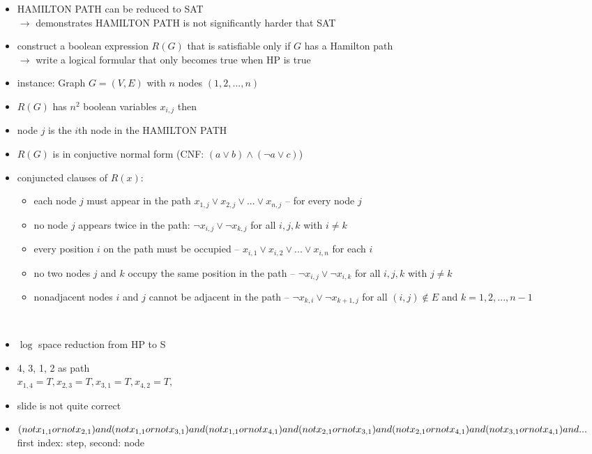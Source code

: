 \documentclass[a4]{scrartcl}
\begin{document}
\begin{itemize}
\item HAMILTON PATH can be reduced to SAT \\
$\rightarrow$ demonstrates HAMILTON PATH is not significantly harder that SAT
\item construct a boolean expression $R(G)$ that is satisfiable only if $G$ has a Hamilton path \\
$\rightarrow$ write a logical formular that only becomes true when HP is true 

\item instance: Graph $G = (V,E)$ with $n$ nodes $(1, 2, ..., n)$ 
\item $R(G)$ has $n^2$ boolean variables $x_{i,j}$ then
\item node $j$ is the $i$th node in the HAMILTON PATH
\item $R(G)$ is in conjuctive normal form (CNF: $(a \vee b) \wedge (\lnot a \vee c)$)
\item conjuncted clauses of $R(x)$:
\begin{itemize}
\item each node $j$ must appear in the path $x_{1,j} \vee x_{2,j} \vee ... \vee x_{n,j}$ -- for every node $j$
\item no node $j$ appears twice in the path: $\lnot x_{i,j} \vee \lnot x_{k,j}$ for all $i, j, k$ with $i \neq k$
\item every position $i$ on the path must be occupied -- $x_{i,1} \vee x_{i,2} \vee ... \vee x_{i,n}$ for each $i$
\item no two nodes $j$ and $k$ occupy the same position in the path -- $\lnot x_{i,j} \vee \lnot x_{i,k}$ for all $i, j, k$ with $j \neq k$
\item nonadjacent nodes $i$ and $j$ cannot be adjacent in the path -- $\lnot x_{k,i} \vee \lnot x_{k+1,j}$ for all $(i, j) \notin E$ and $k= 1, 2, ..., n-1$
\end{itemize}

\cite{HPSAT}



\end{itemize}




\ \\
\begin{itemize}
\item $\log$ space reduction from HP to S
\item 4, 3, 1, 2 as path \\
$x_{1,4} = T, x_{2,3} = T,x_{3,1} = T,x_{4,2} = T,$
\item slide is not quite correct
\item $(not x_{1,1} or not x_{2,1}) and (not x_{1,1} or not x_{3,1}) \\ and (not x_{1,1} or not x_{4,1}) and (not x_{2,1} or not x_{3,1}) \\ and (not x_{2,1} or not x_{4,1}) and (not x_{3,1} or not x_{4,1}) and ...$ \\
first index: step, second: node
\end{itemize}
\end{document}
